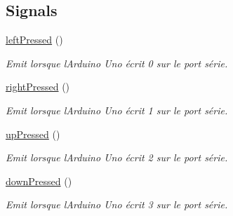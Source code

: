 \subsection*{Signals}
\begin{DoxyCompactItemize}
\item 
\hypertarget{class_arduino_handler_a1dd15c0e5f445513786357afaaef77c2}{}\hyperlink{class_arduino_handler_a1dd15c0e5f445513786357afaaef77c2}{left\+Pressed} ()\label{class_arduino_handler_a1dd15c0e5f445513786357afaaef77c2}

\begin{DoxyCompactList}\small\item\em Emit lorsque l\textquotesingle{}Arduino Uno écrit \textquotesingle{}0\textquotesingle{} sur le port série. \end{DoxyCompactList}\item 
\hypertarget{class_arduino_handler_a19385694c1005697b86a87cbf20f1942}{}\hyperlink{class_arduino_handler_a19385694c1005697b86a87cbf20f1942}{right\+Pressed} ()\label{class_arduino_handler_a19385694c1005697b86a87cbf20f1942}

\begin{DoxyCompactList}\small\item\em Emit lorsque l\textquotesingle{}Arduino Uno écrit \textquotesingle{}1\textquotesingle{} sur le port série. \end{DoxyCompactList}\item 
\hypertarget{class_arduino_handler_a423874e576e74e8cc12907ff129c106e}{}\hyperlink{class_arduino_handler_a423874e576e74e8cc12907ff129c106e}{up\+Pressed} ()\label{class_arduino_handler_a423874e576e74e8cc12907ff129c106e}

\begin{DoxyCompactList}\small\item\em Emit lorsque l\textquotesingle{}Arduino Uno écrit \textquotesingle{}2\textquotesingle{} sur le port série. \end{DoxyCompactList}\item 
\hypertarget{class_arduino_handler_ad7808be978d8e9206fa60f2cdd27f303}{}\hyperlink{class_arduino_handler_ad7808be978d8e9206fa60f2cdd27f303}{down\+Pressed} ()\label{class_arduino_handler_ad7808be978d8e9206fa60f2cdd27f303}

\begin{DoxyCompactList}\small\item\em Emit lorsque l\textquotesingle{}Arduino Uno écrit \textquotesingle{}3\textquotesingle{} sur le port série. \end{DoxyCompactList}\end{DoxyCompactItemize}
